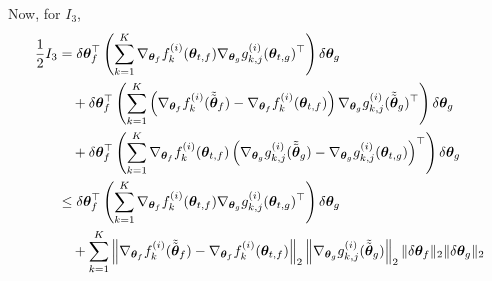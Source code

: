 Now, for $I_3$,
\begin{align*}
    \frac{1}{2}I_3 & = \delta \vtheta_f^\top \left( \sum_{k=1}^K \nabla_{\vtheta_f} f_k^{(i)}(\vtheta_{t,f}) \nabla_{\vtheta_g} g_{k,j}^{(i)}(\vtheta_{t,g})^\top \right) \delta \vtheta_g \\
    & \quad + \delta \vtheta_f^\top \left(\sum_{k=1}^K \left( \nabla_{\vtheta_f} f_k^{(i)}(\tilde{\tilde{\vtheta}}_f) - \nabla_{\vtheta_f} f_k^{(i)}(\vtheta_{t,f}) \right) \nabla_{\vtheta_g} g_{k,j}^{(i)}(\tilde{\tilde{\vtheta}}_g)^\top \right) \delta \vtheta_g \\
    & \quad + \delta \vtheta_f^\top \left(\sum_{k=1}^K \nabla_{\vtheta_f} f_k^{(i)}(\vtheta_{t,f}) \left( \nabla_{\vtheta_g} g_{k,j}^{(i)}(\tilde{\tilde{\vtheta}}_g) - \nabla_{\vtheta_g} g_{k,j}^{(i)}(\vtheta_{t,g}) \right)^\top \right) \delta \vtheta_g \\
    & \leq
    \delta \vtheta_f^\top \left( \sum_{k=1}^K \nabla_{\vtheta_f} f_k^{(i)}(\vtheta_{t,f}) \nabla_{\vtheta_g} g_{k,j}^{(i)}(\vtheta_{t,g})^\top \right) \delta \vtheta_g 
    \\
    &\quad+\sum^K_{k=1}  \left\| \nabla_{\vtheta_f} f_k^{(i)}(\tilde{\tilde{\vtheta}}_f) - \nabla_{\vtheta_f} f_k^{(i)}(\vtheta_{t,f}) \right\|_2 \left\| \nabla_{\vtheta_g} g_{k,j}^{(i)}(\tilde{\tilde{\vtheta}}_g) \right\|_2 \| \delta \vtheta_f \|_2 \| \delta \vtheta_g \|_2  \\

\end{align*}
